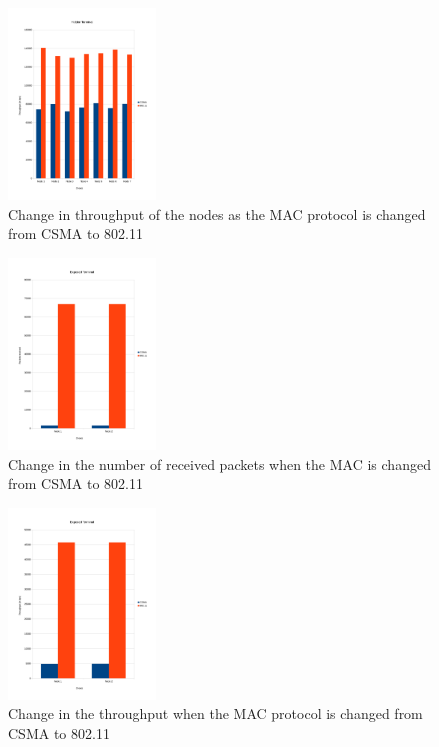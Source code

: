 \begin{figure}[t]
  \centering
  \includegraphics[width=0.35\textwidth, scale=0.5]{figures/hidden_thrput.pdf}
  \caption{Change in throughput of the nodes as the MAC protocol is changed from CSMA to 802.11}
  \label{fig:overhead}
\end{figure}

\begin{figure}[t]
  \centering
  \includegraphics[width=0.35\textwidth, scale=0.5]{figures/exposed_recvPkts.pdf}
  \caption{Change in the number of received packets when the MAC is changed from CSMA to 802.11}
  \label{fig:setup}
\end{figure}

\begin{figure}[t]
  \centering
  \includegraphics[width=0.35\textwidth, scale=0.5]{figures/exposed_thrput.pdf}
  \caption{Change in the throughput when the MAC protocol is changed from CSMA to 802.11}
  \label{fig:overhead}
\end{figure}

